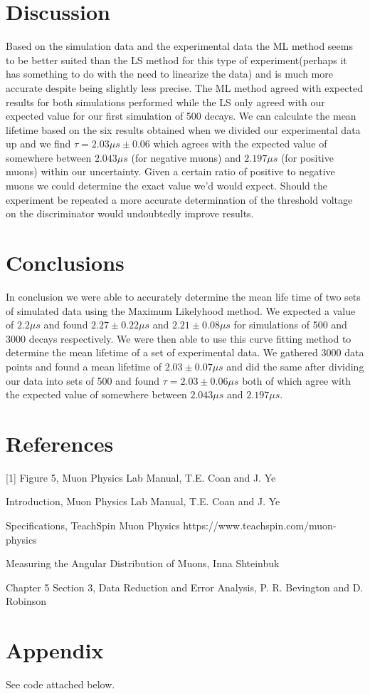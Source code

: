 \documentclass{article}
\begin{document}
\section{Discussion}

Based on the simulation data and the experimental data the ML method seems to be better suited than the LS method for this type of experiment(perhaps it has something to do with the need to linearize the data) and is much more accurate despite being slightly less precise.  The ML method agreed with expected results for both simulations performed while the LS only agreed with our expected value for our first simulation of 500 decays.  We can calculate the mean lifetime based on the six results obtained when we divided our experimental data up and we find $\tau=2.03 \mu s \pm 0.06$ which agrees with the expected value of somewhere between $2.043 \mu s$ (for negative muons) and $2.197 \mu s$ (for positive muons) within our uncertainty.  Given a certain ratio of positive to negative muons we could determine the exact value we'd would expect.  Should the experiment be repeated a more accurate determination of the threshold voltage on the discriminator would undoubtedly improve results.  

\section{Conclusions}

In conclusion we were able to accurately determine the mean life time of two sets of simulated data using the Maximum Likelyhood method.  We expected a value of $2.2 \mu s$ and found $2.27 \pm 0.22 \mu s$ and $2.21 \pm 0.08 \mu s$ for simulations of 500 and 3000 decays respectively.  We were then able to use this curve fitting method to determine the mean lifetime of a set of experimental data.  We gathered 3000 data points and found a mean lifetime of $2.03 \pm 0.07 \mu s$ and did the same after dividing our data into sets of 500 and found $\tau=2.03 \pm 0.06 \mu s$ both of which agree with the expected value of somewhere between $2.043 \mu s$ and $2.197 \mu s$.

\section{References}


[1] Figure 5, Muon Physics Lab Manual, T.E. Coan and J. Ye 

\noindent[2] Introduction, Muon Physics Lab Manual, T.E. Coan and J. Ye

\noindent [3] Specifications, TeachSpin Muon Physics https://www.teachspin.com/muon-physics

\noindent[4] Measuring the Angular Distribution of Muons, Inna Shteinbuk

\noindent[5] Chapter 5 Section 3,  Data Reduction and Error Analysis, P. R. Bevington and D. Robinson

\section{Appendix}

See code attached below.
\end{document}
